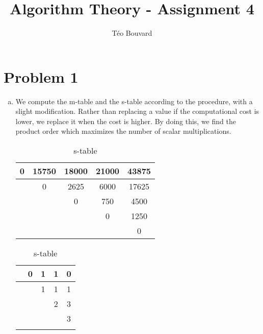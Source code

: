 \documentclass[a4paper, 10pt, twoside]{article}
\begin{document}
\title{Algorithm Theory - Assignment 4}
\author{T\'eo Bouvard}
\maketitle

\section*{Problem 1}
\begin{enumerate}[a)]
	\item We compute the m-table and the s-table according to the  procedure, with a slight modification. Rather than replacing a value if the computational cost is lower, we replace it when the cost is higher. By doing this, we find the product order which maximizes the number of scalar multiplications.

	      \begin{table}[!htb]
		      \begin{minipage}{.66\textwidth}
			      \centering
			      \caption{m-table}
			      \begin{tabular}{|c|c|c|c|c|}
				      \hline
				      0 & 15750 & 18000 & 21000 & 43875 \\ \hline
				        & 0     & 2625  & 6000  & 17625 \\ \hline
				        &       & 0     & 750   & 4500  \\ \hline
				        &       &       & 0     & 1250  \\ \hline
				        &       &       &       & 0     \\ \hline
			      \end{tabular}
		      \end{minipage}
		      \begin{minipage}{.33\textwidth}
			      \centering
			      \caption{s-table}
			      \begin{tabular}{|c|c|c|c|c|}
				      \hline
				       & 0 & 1 & 1 & 0 \\ \hline
				       &   & 1 & 1 & 1 \\ \hline
				       &   &   & 2 & 3 \\ \hline
				       &   &   &   & 3 \\ \hline
				       &   &   &   &   \\ \hline
			      \end{tabular}
		      \end{minipage}
	      \end{table}
\end{enumerate}
\end{document}
